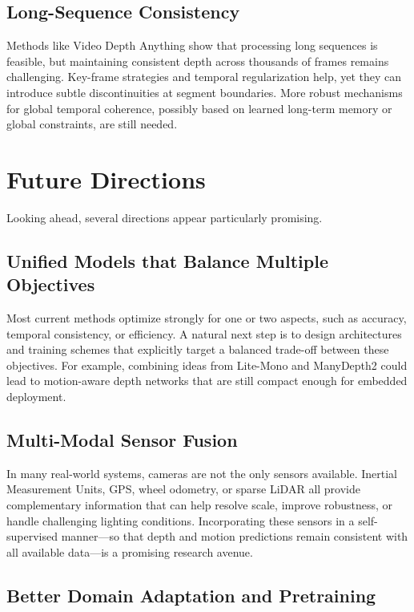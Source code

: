 \documentclass[10pt,twocolumn,letterpaper]{article}
\begin{document}
\subsection{Long-Sequence Consistency}

Methods like Video Depth Anything show that processing long sequences is feasible, but maintaining consistent depth across thousands of frames remains challenging. Key-frame strategies and temporal regularization help, yet they can introduce subtle discontinuities at segment boundaries. More robust mechanisms for global temporal coherence, possibly based on learned long-term memory or global constraints, are still needed.

\section{Future Directions}
\label{sec:future}

Looking ahead, several directions appear particularly promising.

\subsection{Unified Models that Balance Multiple Objectives}

Most current methods optimize strongly for one or two aspects, such as accuracy, temporal consistency, or efficiency. A natural next step is to design architectures and training schemes that explicitly target a balanced trade-off between these objectives. For example, combining ideas from Lite-Mono and ManyDepth2 could lead to motion-aware depth networks that are still compact enough for embedded deployment.

\subsection{Multi-Modal Sensor Fusion}

In many real-world systems, cameras are not the only sensors available. Inertial Measurement Units, GPS, wheel odometry, or sparse LiDAR all provide complementary information that can help resolve scale, improve robustness, or handle challenging lighting conditions. Incorporating these sensors in a self-supervised manner—so that depth and motion predictions remain consistent with all available data—is a promising research avenue.

\subsection{Better Domain Adaptation and Pretraining}
\end{document}
